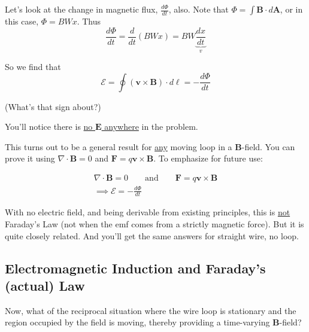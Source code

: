\documentclass{article}
\numberwithin{equation}{section}
\begin{document}
Let's look at the change in magnetic flux, $\displaystyle \frac{d \Phi}{dt}$, also. Note that $\displaystyle \Phi = \int \bm{B} \cdot d\bm{A}$, or in this case, $\Phi = BWx$. Thus
\begin{equation*}
    \frac{d \Phi}{dt} = \frac{d}{dt} \left( B W x \right) = B W \underbrace{\frac{d x}{dt}}_{\displaystyle v}
\end{equation*}

So we find that
\begin{equation*}
    \boxed{\mathcal{E} = \oint \left( \bm{v} \times \bm{B} \right) \cdot d\bm{\ell} = -\frac{d \Phi}{dt}}
\end{equation*}

(What's that sign about?)

You'll notice there is \underline{no $\bm{E}$ anywhere} in the problem.

This turns out to be a general result for \underline{any} moving loop in a $\bm{B}$-field. You can prove it using $\nabla \cdot \bm{B} = 0$ and $\bm{F} = q\bm{v} \times \bm{B}$. To emphasize for future use:
\begin{mdframed}[backgroundcolor=WHITE,align=center,userdefinedwidth=20em]
\begin{gather*}
    \nabla \cdot \bm{B} = 0 \qquad \text{and} \qquad \bm{F} = q\bm{v} \times \bm{B} \\
    \implies \mathcal{E} = -\frac{d \Phi}{dt}
\end{gather*}
\end{mdframed}

With no electric field, and being derivable from existing principles, this is \underline{not} Faraday's Law (not when the emf comes from a strictly magnetic force). But it is quite closely related. And you'll get the same answers for straight wire, no loop.

\subsection*{Electromagnetic Induction and Faraday's (actual) Law}

Now, what of the reciprocal situation where the wire loop is stationary and the region occupied by the field is moving, thereby providing a time-varying $\bm{B}$-field?
\end{document}
